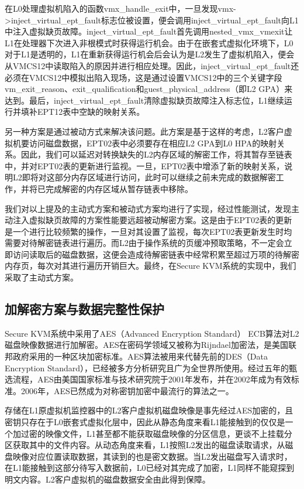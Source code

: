 在L0处理虚拟机陷入的函数vmx\_handle\_exit中，一旦发现vmx->inject\_vi\-rtual\_ept\_fault标志位被设置，便会调用inject\_virtual\_ept\_fault向L1中注入虚拟缺页故障。inject\_virtual\_ept\_fault首先调用nested\_vmx\_vmexit让L1在处理器下次进入非根模式时获得运行机会。由于在嵌套式虚拟化环境下，L0对于L1是透明的，L1在重新获得运行机会后会认为是L2发生了虚拟机陷入，便会从VMCS12中读取陷入的原因并进行相应处理。因此，inject\_virtual\_ept\_fault还必须在VMCS12中模拟出陷入现场，这是通过设置VMCS12中的三个关键字段vm\_exit\_reason、exit\_qualification和guest\_physical\_address（即L2 GPA）来达到。最后，inject\_virtual\_ept\_fault清除虚拟缺页故障注入标志位，L1继续运行并填补EPT12表中空缺的映射关系。

另一种方案是通过被动方式来解决该问题。此方案是基于这样的考虑，L2客户虚拟机要访问磁盘数据，EPT02表中必须要存在相应L2 GPA到L0 HPA的映射关系。因此，我们可以延迟对转换缺失的L2内存区域的解密工作，将其暂存至链表中，并对EPT02表的更新进行监视。一旦，EPT02表中增添了新的映射关系，说明L2即将对这部分内存区域进行访问，此时可以继续之前未完成的数据解密工作，并将已完成解密的内存区域从暂存链表中移除。

我们对以上提及的主动式方案和被动式方案均进行了实现，经过性能测试，发现主动注入虚拟缺页故障的方案性能要远超被动解密方案。这是由于EPT02表的更新是一个进行比较频繁的操作，一旦对其设置了监视，每次EPT02表更新发生时均需要对待解密链表进行遍历。而L2由于操作系统的页缓冲预取策略，不一定会立即访问读取后的磁盘数据，这便会造成待解密链表中经常积累至超过万项的待解密内存页，每次对其进行遍历开销巨大。最终，在Secure KVM系统的实现中，我们采取了主动式方案。

\subsection{加解密方案与数据完整性保护}

Secure KVM系统中采用了AES（Advanced Encryption Standard） ECB算法对L2磁盘映像数据进行加解密。AES在密码学领域又被称为Rijndael加密法，是美国联邦政府采用的一种区块加密标准。AES算法被用来代替先前的DES（Data Encryption Standard），已经被多方分析研究且广为全世界所使用。经过五年的甄选流程，AES由美国国家标准与技术研究院于2001年发布，并在2002年成为有效标准。2006年，AES已然成为对称密钥加密中最流行的算法之一。

存储在L1原虚拟机监控器中的L2客户虚拟机磁盘映像是事先经过AES加密的，且密钥只存在于L0嵌套式虚拟化层中，因此从静态角度来看L1能接触到的仅仅是一个加过密的映像文件，L1甚至都不能获取磁盘映像的分区信息，更谈不上挂载分区获取其中的文件内容。从动态角度来看，L1按照L2发出的磁盘读取请求，从磁盘映像对应位置读取数据，其读到的也是密文数据。当L2发出磁盘写入请求时，在L1能接触到这部分待写入数据前，L0已经对其完成了加密，L1同样不能窥探到明文内容。L2客户虚拟机的磁盘数据安全由此得到保障。

